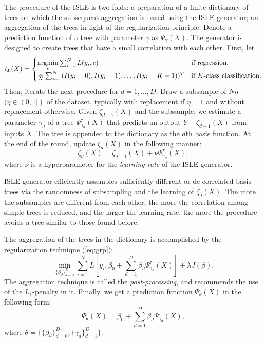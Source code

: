 \documentclass[12pt]{article}
\newcommand{\argmin}{\mathop{\rm argmin}\limits}
\begin{document}
The procedure of the ISLE is two folds: a preparation of a finite dictionary of trees on which the subsequent aggregation is based using the ISLE generator; an aggregation of the trees in light of the regularization principle. Denote a prediction function of a tree with parameter $\gamma$ as $\Psi_{\gamma}^{\tau}(X)$. The generator is designed to create trees that have a small correlation with each other. First, let
\begin{equation*}
\zeta_0(X) = 
\begin{cases}
\argmin_c \sum_{i=1}^N L(y_i,c) & \text{if regression,}\\
\frac{1}{N} \sum_{i=1}^N (I(y_i = 0),I(y_i = 1),\dots,I(y_i = K-1))^T & \text{if $K$-class classification.}
\end{cases}
\end{equation*}
Then, iterate the next procedure for $d=1,\dots,D$. Draw a subsample of $N \eta$ $(\eta \in (0,1])$ of the dataset, typically with replacement if $\eta = 1$ and without replacement otherwise. Given $\zeta_{d-1}(X)$ and the subsample, we estimate a parameter $\gamma_d$ of a tree $\Psi_{\gamma_d}^{\tau}(X)$ that predicts an output $Y - \zeta_{d-1}(X)$ from inputs $X$. The tree is appended to the dictionary as the $d$th basis function. At the end of the round, update $\zeta_{d}(X)$ in the following manner:
\begin{equation*}
\zeta_{d}(X) = \zeta_{d-1}(X) + \nu \Psi_{\gamma_d}^{\tau}(X),
\end{equation*}
where $\nu$ is a hyperparameter for the {\it learning rate} of the ISLE generator.

ISLE generator efficiently assembles sufficiently different or de-correlated basis trees via the randomness of subsampling and the learning of $\zeta_{d}(X)$. The more the subsamples are different from each other, the more the correlation among simple trees is reduced, and the larger the learning rate, the more the procedure avoids a tree similar to those found before.

The aggregation of the trees in the dictionary is accomplished by the regularization technique (\ref{eq:grp}):
\begin{equation*}
\min_{\{\beta_d\}_{d=0}^D} \sum_{i=1}^N L[y_i,\beta_0 + \sum_{d=1}^D \beta_d \Psi_{\gamma_d}^{\tau}(X)] + \lambda J(\beta).
\end{equation*}
The aggregation technique is called the {\it post-processing}, and \textcite{Friedman2003} recommends the use of the $L_1$-penalty in it. Finally, we get a prediction function $\Psi_{\theta}(X)$ in the following form:
\begin{equation*}
\Psi_{\theta}(X) = \beta_0 + \sum_{d=1}^D \beta_d \Psi_{\gamma_d}^{\tau}(X),
\end{equation*}
where $\theta = \{\{\beta_d\}_{d=0}^D, \{\gamma_d\}_{d=1}^D\}$.
\end{document}
